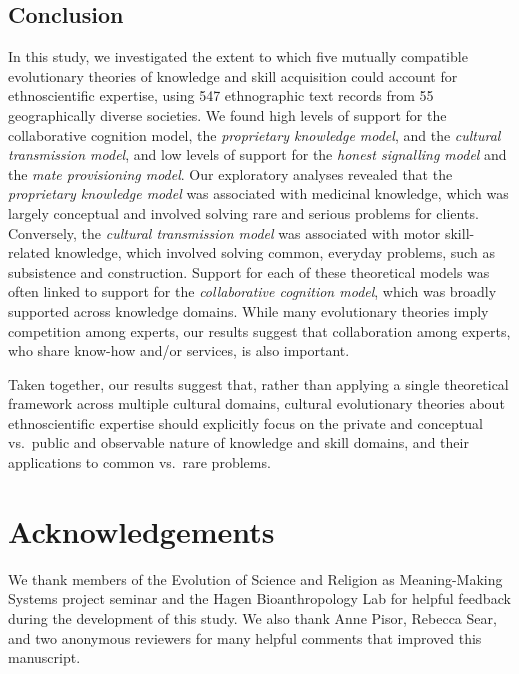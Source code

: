\documentclass[
  11pt,
]{article}
\begin{document}
\hypertarget{conclusion}{%
\subsection{Conclusion}\label{conclusion}}

In this study, we investigated the extent to which five mutually compatible evolutionary theories of knowledge and skill acquisition could account for ethnoscientific expertise, using 547 ethnographic text records from 55 geographically diverse societies. We found high levels of support for the collaborative cognition model, the \emph{proprietary knowledge model}, and the \emph{cultural transmission model}, and low levels of support for the \emph{honest signalling model} and the \emph{mate provisioning model}. Our exploratory analyses revealed that the \emph{proprietary knowledge model} was associated with medicinal knowledge, which was largely conceptual and involved solving rare and serious problems for clients. Conversely, the \emph{cultural transmission model} was associated with motor skill-related knowledge, which involved solving common, everyday problems, such as subsistence and construction. Support for each of these theoretical models was often linked to support for the \emph{collaborative cognition model}, which was broadly supported across knowledge domains. While many evolutionary theories imply competition among experts, our results suggest that collaboration among experts, who share know-how and/or services, is also important.

Taken together, our results suggest that, rather than applying a single theoretical framework across multiple cultural domains, cultural evolutionary theories about ethnoscientific expertise should explicitly focus on the private and conceptual vs.~public and observable nature of knowledge and skill domains, and their applications to common vs.~rare problems.

\hypertarget{acknowledgements}{%
\section{Acknowledgements}\label{acknowledgements}}

We thank members of the Evolution of Science and Religion as Meaning-Making Systems project seminar and the Hagen Bioanthropology Lab for helpful feedback during the development of this study. We also thank Anne Pisor, Rebecca Sear, and two anonymous reviewers for many helpful comments that improved this manuscript.
\end{document}
